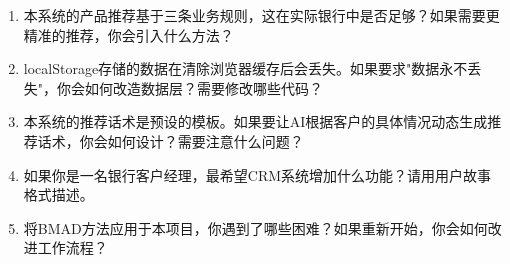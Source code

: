 \begin{exercisebox}[思考与讨论]
\begin{enumerate}[leftmargin=2em]
  \item 本系统的产品推荐基于三条业务规则，这在实际银行中是否足够？如果需要更精准的推荐，你会引入什么方法？
  \item localStorage存储的数据在清除浏览器缓存后会丢失。如果要求"数据永不丢失"，你会如何改造数据层？需要修改哪些代码？
  \item 本系统的推荐话术是预设的模板。如果要让AI根据客户的具体情况动态生成推荐话术，你会如何设计？需要注意什么问题？
  \item 如果你是一名银行客户经理，最希望CRM系统增加什么功能？请用用户故事格式描述。
  \item 将BMAD方法应用于本项目，你遇到了哪些困难？如果重新开始，你会如何改进工作流程？
\end{enumerate}
\end{exercisebox}
